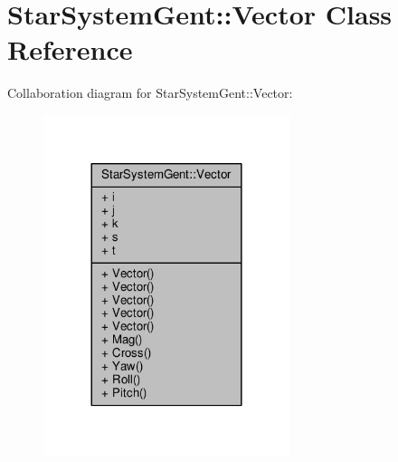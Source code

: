 \hypertarget{classStarSystemGent_1_1Vector}{}\section{Star\+System\+Gent\+:\+:Vector Class Reference}
\label{classStarSystemGent_1_1Vector}


Collaboration diagram for Star\+System\+Gent\+:\+:Vector\+:
\nopagebreak
\begin{figure}[H]
\begin{center}
\leavevmode
\includegraphics[width=204pt]{da/dfb/classStarSystemGent_1_1Vector__coll__graph}
\end{center}
\end{figure}
